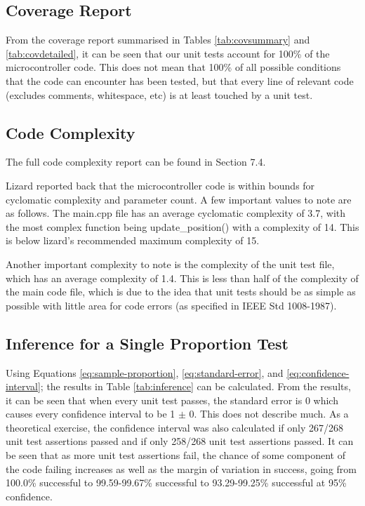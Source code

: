 \documentclass[12pt]{article}
\begin{document}
\subsection{Coverage Report}
From the coverage report summarised in Tables \ref{tab:covsummary} and \ref{tab:covdetailed}, it can be seen that our unit tests account for 100\% of the microcontroller code. This does not mean that 100\% of all possible conditions that the code can encounter has been tested, but that every line of relevant code (excludes comments, whitespace, etc) is at least touched by a unit test.

\subsection{Code Complexity}
The full code complexity report can be found in Section 7.4.

Lizard reported back that the microcontroller code is within bounds for cyclomatic complexity and parameter count. A few important values to note are as follows. The main.cpp file has an average cyclomatic complexity of 3.7, with the most complex function being update\_position() with a complexity of 14. This is below lizard's recommended maximum complexity of 15.

Another important complexity to note is the complexity of the unit test file, which has an average complexity of 1.4. This is less than half of the complexity of the main code file, which is due to the idea that unit tests should be as simple as possible with little area for code errors (as specified in IEEE Std 1008-1987).

\subsection{Inference for a Single Proportion Test}
Using Equations \ref{eq:sample-proportion}, \ref{eq:standard-error}, and \ref{eq:confidence-interval}; the results in Table \ref{tab:inference} can be calculated. From the results, it can be seen that when every unit test passes, the standard error is 0 which causes every confidence interval to be 1 $\pm$ 0. This does not describe much. As a theoretical exercise, the confidence interval was also calculated if only 267/268 unit test assertions passed and if only 258/268 unit test assertions passed. It can be seen that as more unit test assertions fail, the chance of some component of the code failing increases as well as the margin of variation in success, going from 100.0\% successful to 99.59-99.67\% successful to 93.29-99.25\% successful at 95\% confidence.
\end{document}
